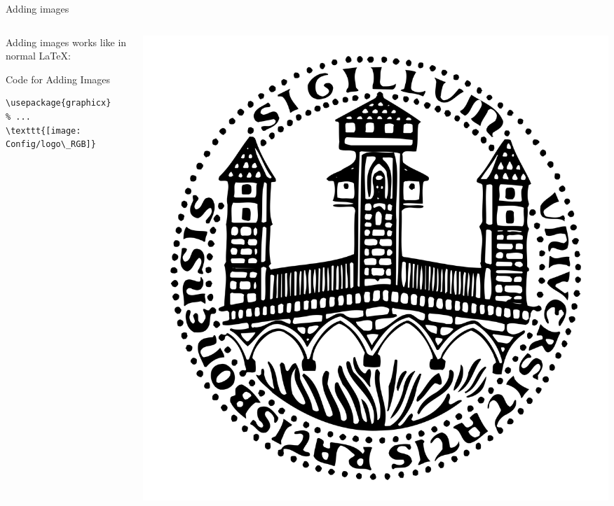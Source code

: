 \begin{frame}[fragile]{Adding images}
\begin{columns}  %
\begin{column}{0.7\textwidth}
Adding images works like in normal \LaTeX:
\begin{block}{Code for Adding Images}
\begin{verbatim}
\usepackage{graphicx}
% ...
\texttt{[image: Config/logo\_RGB]}
\end{verbatim}
\end{block}
\end{column}
\begin{column}{0.3\textwidth}
\includegraphics[width=\textwidth]{Config/logo_transparent.png}
\end{column}
\end{columns}
\end{frame}


